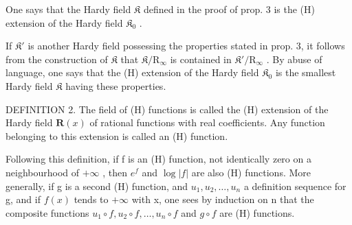 One says that the Hardy field \(\mathfrak{K}\) defined in the proof of prop. 3 is the (H) extension of the Hardy field \(\mathfrak{K}_0\) .

If \(\mathfrak{K}'\) is another Hardy field possessing the properties stated in prop. 3, it follows from the construction of \(\mathfrak{K}\) that \(\mathfrak{K} / \mathrm{R}_{\infty}\) is contained in \(\mathfrak{K}' / \mathrm{R}_{\infty}\) . By abuse of language, one says that the (H) extension of the Hardy field \(\mathfrak{K}_0\) is the smallest Hardy field \(\mathfrak{K}\) having these properties.

DEFINITION 2. The field of (H) functions is called the (H) extension of the Hardy field \(\mathbf{R}(x)\) of rational functions with real coefficients. Any function belonging to this extension is called an (H) function.

Following this definition, if f is an (H) function, not identically zero on a neighbourhood of \(+\infty\) , then \(e^{f}\) and \(\log |f|\) are also (H) functions. More generally, if g is a second (H) function, and \(u_{1}, u_{2}, \ldots, u_{n}\) a definition sequence for g, and if \(f(x)\) tends to \(+\infty\) with x, one sees by induction on n that the composite functions \(u_{1} \circ f, u_{2} \circ f, \ldots, u_{n} \circ f\) and \(g \circ f\) are (H) functions.

